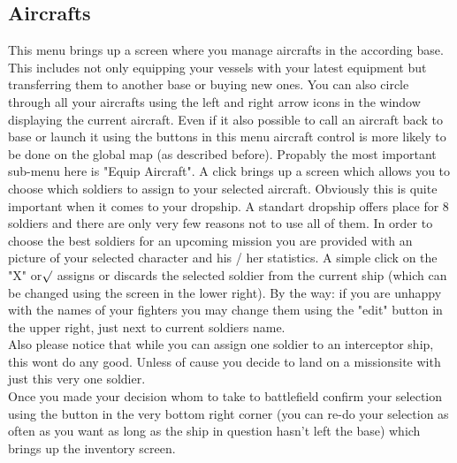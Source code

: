 \subsection{Aircrafts}
This menu brings up a screen where you manage aircrafts in the according base. This includes not only equipping your vessels with your latest equipment but transferring them to another base or buying new ones. You can also circle through all your aircrafts using the left and right arrow icons in the window displaying the current aircraft. Even if it also possible to call an aircraft back to base or launch it using the buttons in this menu aircraft control is more likely to be done on the global map (as described before).
Propably the most important sub-menu here is "Equip Aircraft".  A click brings up a screen which allows you to choose which soldiers to assign to your selected aircraft. Obviously this is quite important when it comes to your dropship. A standart dropship offers place for 8 soldiers and there are only very few reasons not to use all of them. In order to choose the best soldiers for an upcoming mission you are provided with an picture of your selected character and his / her statistics. A simple click on the "X" or$\surd$ assigns or discards the selected soldier from the current ship (which can be changed using the screen in the lower right). By the way: if you are unhappy with the names of your fighters you may change them using the "edit" button in the upper right, just next to current soldiers name.\\
Also please notice that while you can assign one soldier to an interceptor ship, this wont do any good. Unless of cause you decide to land on a missionsite with just this very one soldier.\\
Once you made your decision whom to take to battlefield confirm your selection using the button in the very bottom right corner (you can re-do your selection as often as you want as long as the ship in question hasn't left the base) which brings up the inventory screen.

